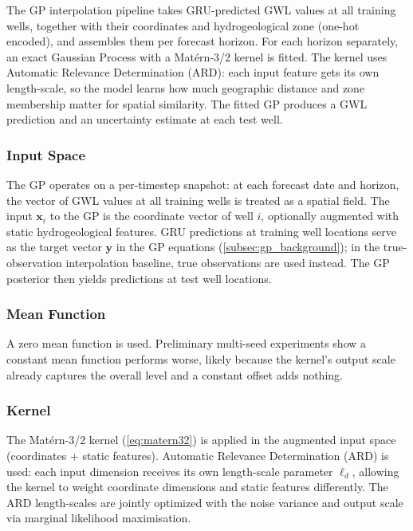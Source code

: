 The GP interpolation pipeline takes GRU-predicted GWL values at all training wells, together
with their coordinates and hydrogeological zone (one-hot encoded), and assembles them per
forecast horizon. For each horizon separately, an exact Gaussian Process with a Matérn-3/2
kernel is fitted. The kernel uses Automatic Relevance Determination (ARD): each input feature
gets its own length-scale, so the model learns how much geographic distance and zone membership
matter for spatial similarity. The fitted GP produces a GWL prediction and an uncertainty
estimate at each test well.

\subsubsection{Input Space}

The GP operates on a per-timestep snapshot: at each forecast date and horizon, the vector of
GWL values at all training wells is treated as a spatial field. The input $\mathbf{x}_i$ to
the GP is the coordinate vector of well $i$, optionally augmented with
static hydrogeological features. GRU predictions
at training well locations serve as the target vector $\mathbf{y}$ in the GP equations
(\cref{subsec:gp_background}); in the true-observation interpolation baseline, true observations are used
instead. The GP posterior then yields predictions at test well locations.

\subsubsection{Mean Function}

A zero mean function is used. Preliminary multi-seed experiments show a constant mean function performs worse, likely because the kernel's output scale already captures the overall level and a constant offset adds nothing.

\subsubsection{Kernel}

The Matérn-3/2 kernel (\cref{eq:matern32}) is applied in the augmented input space
(coordinates + static features). Automatic Relevance Determination (ARD) is used: each input
dimension receives its own length-scale parameter $\ell_d$, allowing the kernel to weight
coordinate dimensions and static features differently. The ARD length-scales are jointly
optimized with the noise variance and output scale via marginal likelihood maximisation.

